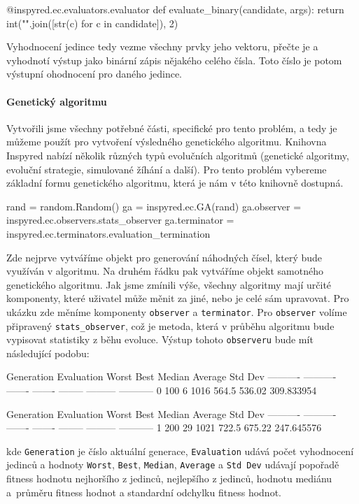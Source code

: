 \begin{code}
@inspyred.ec.evaluators.evaluator
def evaluate_binary(candidate, args):
    return int("".join([str(c) for c in candidate]), 2)
\end{code}

Vyhodnocení jedince tedy vezme všechny prvky jeho vektoru, přečte je a
vyhodnotí výstup jako binární zápis nějakého celého čísla. Toto číslo je potom
výstupní ohodnocení pro daného jedince.

\paragraph{Genetický algoritmu}
Vytvořili jsme všechny potřebné části, specifické pro tento problém, a tedy je
můžeme použít pro vytvoření výsledného genetického algoritmu. Knihovna Inspyred
nabízí několik různých typů evolučních algoritmů (genetické algoritmy, evoluční
strategie, simulované žíhání a další). Pro tento problém vybereme
základní formu genetického algoritmu, která je nám v této knihovně dostupná.

\begin{code}
rand = random.Random()
ga = inspyred.ec.GA(rand)
ga.observer = inspyred.ec.observers.stats_observer
ga.terminator = inspyred.ec.terminators.evaluation_termination
\end{code}

Zde nejprve vytváříme objekt pro generování náhodných čísel, který bude
využíván v algoritmu. Na druhém řádku pak vytváříme objekt samotného
genetického algoritmu. Jak jsme zmínili výše, všechny algoritmy mají určité
komponenty, které uživatel může měnit za jiné, nebo je celé sám upravovat. Pro
ukázku zde měníme komponenty \texttt{observer} a \texttt{terminator}. Pro
\texttt{observer} volíme připravený \texttt{stats\_observer}, což je metoda,
která v průběhu algoritmu bude vypisovat statistiky z běhu evoluce. Výstup
tohoto \texttt{observeru} bude mít následující podobu:

\begin{code}
Generation Evaluation   Worst    Best   Median   Average     Std Dev
---------- ---------- ------- ------- -------- --------- -----------      
         0        100       6    1016    564.5    536.02  309.833954

Generation Evaluation   Worst    Best   Median   Average     Std Dev
---------- ---------- ------- ------- -------- --------- -----------     
         1        200      29    1021    722.5    675.22  247.645576
\end{code}
kde \texttt{Generation} je číslo aktuální generace, \texttt{Evaluation} udává
počet vyhodnocení jedinců a hodnoty \texttt{Worst}, \texttt{Best},
\texttt{Median}, \texttt{Average} a \texttt{Std Dev} udávají popořadě fitness
hodnotu nejhoršího z jedinců, nejlepšího z jedinců, hodnotu mediánu a~průměru
fitness hodnot a standardní odchylku fitness hodnot.

